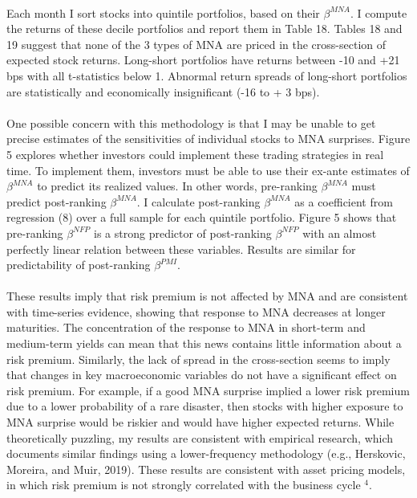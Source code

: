 \documentclass[12pt]{article}
\begin{document}
\paragraph{}
Each month I sort stocks into quintile portfolios, based on their $\beta^{MNA}$. I compute the returns of these decile portfolios and report them in Table 18. Tables 18 and 19 suggest that none of the 3 types of MNA are priced in the cross-section of expected stock returns. Long-short portfolios have returns between -10 and +21 bps with all t-statistics below 1. Abnormal return spreads of long-short portfolios are statistically and economically insignificant (-16 to + 3 bps).
\paragraph{}
One possible concern with this methodology is that I may be unable to get precise estimates of the sensitivities of individual stocks to MNA surprises. Figure 5 explores whether investors could implement these trading strategies in real time. To implement them, investors must be able to use their ex-ante estimates of $\beta^{MNA}$ to predict its realized values. In other words, pre-ranking $\beta^{MNA}$ must predict post-ranking $\beta^{MNA}$. I calculate post-ranking $\beta^{MNA}$ as a coefficient from regression (8) over a full sample for each quintile portfolio. Figure 5 shows that pre-ranking $\beta^{NFP}$ is a strong predictor of post-ranking $\beta^{NFP}$ with an almost perfectly linear relation between these variables. Results are similar for predictability of post-ranking $\beta^{PMI}$.
\paragraph{}
These results imply that risk premium is not affected by MNA and are consistent with time-series evidence, showing that response to MNA decreases at longer maturities. The concentration of the response to MNA in short-term and medium-term yields can mean that this news contains little information about a risk premium. Similarly, the lack of spread in the cross-section seems to imply that changes in key macroeconomic variables do not have a significant effect on risk premium.
For example, if a good MNA surprise implied a lower risk premium due to a lower probability of a rare disaster, then stocks with higher exposure to MNA surprise would be riskier and would have higher expected returns. While theoretically puzzling, my results are consistent with empirical research, which documents similar findings using a lower-frequency methodology (e.g., Herskovic, Moreira, and Muir, 2019). These results are consistent with asset pricing models, in which risk premium is not strongly correlated with the business cycle $^4$. 
\end{document}
